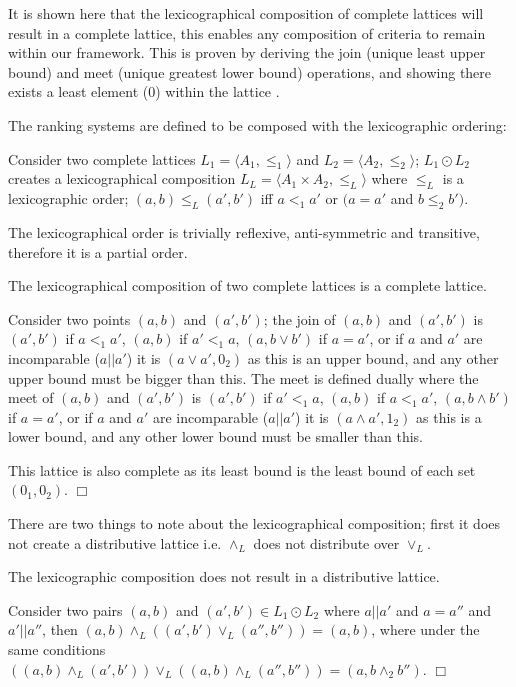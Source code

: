 It is shown here that the lexicographical composition of complete lattices will result in a complete lattice,
this enables any composition of criteria to remain within our framework.
This is proven by deriving the join (unique least upper bound) and meet (unique greatest lower bound) operations,
and showing there exists a least element ($0$) within the lattice \citep{davey1990introduction}. 

The ranking systems are defined to be composed with the lexicographic ordering:
\begin{defs}
\label{def:lex_order}
Consider two complete lattices $L_1 = \langle A_1, \leq_1 \rangle$ and $L_2 = \langle A_2, \leq_2 \rangle$;
$L_1 \odot L_2$ creates a lexicographical composition  $L_L = \langle A_1 \times A_2, \leq_L \rangle$
where $\leq_L$ is a lexicographic order;
$(a,b) \leq_{L} (a',b')$ iff $a <_{1} a'$ or $(a = a'$ and $b \leq_{2} b')$.
\end{defs}

The lexicographical order is trivially reflexive, anti-symmetric and transitive, therefore it is a partial order.
\begin{prop}
The lexicographical composition of two complete lattices is a complete lattice.
\end{prop}
\begin{prof}
Consider two points $(a,b)$ and $(a',b')$; 
the join of $(a,b)$ and $(a',b')$ is $(a',b')$ if $a <_1 a'$,
$(a,b)$ if $a' <_1 a$,
$(a, b \vee b')$ if $a = a'$,
or if $a$ and $a'$ are incomparable ($a||a'$) it is $(a \vee a', 0_2)$
as this is an upper bound, and any other upper bound must be bigger than this.
The meet is defined dually where the meet of $(a,b)$ and $(a',b')$ is $(a',b')$ if $a' <_1 a$,
$(a,b)$ if $a <_1 a'$,
$(a, b \wedge b')$ if $a = a'$,
or if $a$ and $a'$ are incomparable ($a||a'$) it is $(a \wedge a',1_2)$
as this is a lower bound, and any other lower bound must be smaller than this.

This lattice is also complete as its least bound is the least bound of each set $(0_1,0_2)$.
$\Box$\end{prof}

There are two things to note about the lexicographical composition; 
first it does not create a distributive lattice i.e. $\wedge_L$ does not distribute over $\vee_L$.
\begin{prop}
The lexicographic composition does not result in a distributive lattice.
\end{prop}
\begin{prof}
Consider two pairs $(a,b)$ and $(a', b') \in L_1 \odot L_2$ where $a || a'$ and $a = a''$ and $a' || a''$,
then $(a,b) \wedge_{L} ((a', b') \vee_{L} (a'', b'')) = (a,b)$,
where under the same conditions $((a,b) \wedge_{L} (a', b')) \vee_{L} ((a,b) \wedge_{L} (a'', b'')) = (a,b \wedge_2 b'')$.
$\Box$\end{prof}

